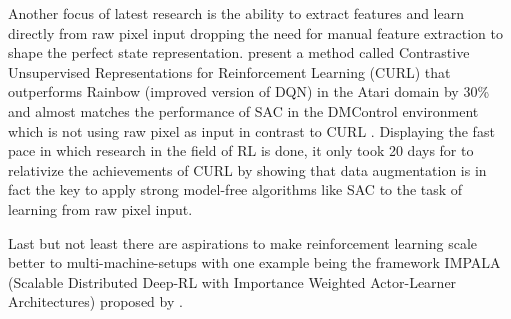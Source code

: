 Another focus of latest research is the ability to extract features and learn directly from raw pixel input dropping the need for manual feature extraction to shape the perfect state representation. \cite{srinivas2020curl} present a method called Contrastive Unsupervised Representations for Reinforcement Learning (CURL) that outperforms Rainbow (improved version of DQN) in the Atari domain by 30\% and almost matches the performance of SAC in the DMControl environment which is not using raw pixel as input in contrast to CURL \cite[p.~7]{srinivas2020curl}. Displaying the fast pace in which research in the field of RL is done, it only took 20 days for \cite{kostrikov2021image} to relativize the achievements of CURL by showing that data augmentation is in fact the key to apply strong model-free algorithms like SAC to the task of learning from raw pixel input.
\par 
Last but not least there are aspirations to make reinforcement learning scale 
better to multi-machine-setups with one example being the framework IMPALA (Scalable Distributed Deep-RL with Importance Weighted
Actor-Learner Architectures) proposed by \cite{espeholt2018impala}.